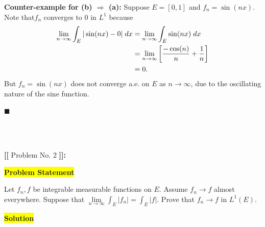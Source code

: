 \documentclass[12pt]{article}
\newcommand{\mybox}{%
    \collectbox{%
        \setlength{\fboxsep}{2pt}%
        \fbox{\BOXCONTENT}%
    }%
}
\begin{document}
\vspace{3mm}

\noindent\textbf{Counter-example for (b) $\Rightarrow$ (a):} Suppose $E=[0,1]$ and $f_n = \sin(nx)$. Note that$f_n$ converges to $0$ in $L^1$ because 
\begin{align}
    \lim\limits_{n\rightarrow\infty}\int_E |\sin(nx)-0| \hspace{1mm} dx &= \lim\limits_{n\rightarrow\infty}\int_E \sin(nx) \hspace{1mm} dx \\
    &= \lim\limits_{n\rightarrow\infty}\left[\frac{-\cos(n)}{n}+\frac{1}{n}\right] \\
    &= 0.
\end{align}
But $f_n=\sin(nx)$ does not converge a.e. on $E$ as $n\rightarrow\infty$, due to the oscillating nature of the sine function.

\hfill$\blacksquare$

\vfill

\begin{center}
\\
\vspace{2mm}
\vspace{-0.65cm}
\hrulefill \\
\vspace{-0.95cm}
\hrulefill
\end{center}

\pagebreak

\noindent \textbf{{\huge [}{\Large [}} Problem No. 2 \textbf{{\Large ]}{\huge ]}}{\Large \textbf{:}}

\vspace{3mm}

\noindent\mybox{\colorbox{yellow}{\textbf{Problem Statement}}}\hspace{3mm}\hrulefill 

\noindent Let $f_n,f$ be integrable measurable functions on $E$. Assume $f_n\rightarrow f$ almost everywhere. Suppose that $\lim\limits_{n\rightarrow\infty}\int_E |f_n| = \int_E |f|$. Prove that $f_n\rightarrow f$ in $L^1(E)$.

\vspace{5mm}

\noindent\mybox{\colorbox{yellow}{\textbf{Solution}}}\hspace{3mm}\hrulefill
\end{document}

